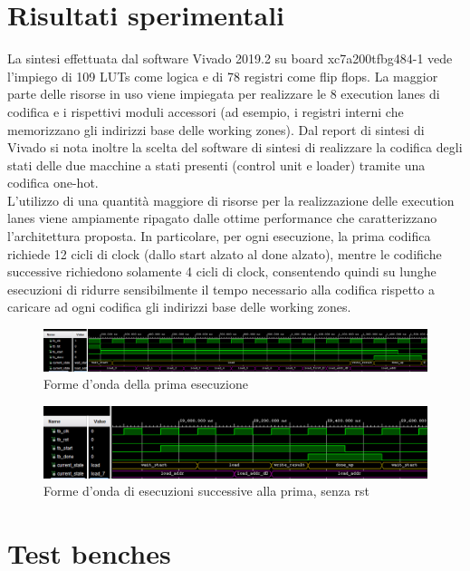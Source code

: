 \documentclass[10pt,english, openany]{book}
\begin{document}
\chapter{Risultati sperimentali}

La sintesi effettuata dal software Vivado 2019.2 su board xc7a200tfbg484-1 vede l’impiego di 109 LUTs come logica e di 78 registri come flip flops. La maggior parte delle risorse in uso viene impiegata per realizzare le 8 execution lanes di codifica e i rispettivi moduli accessori (ad esempio, i registri interni che memorizzano gli indirizzi base delle working zones). Dal report di sintesi di Vivado si nota inoltre la scelta del software di sintesi di realizzare la codifica degli stati delle due macchine a stati presenti (control unit e loader) tramite una codifica one-hot.\\
L’utilizzo di una quantità maggiore di risorse per la realizzazione delle execution lanes viene ampiamente ripagato dalle ottime performance che caratterizzano l’architettura proposta. In particolare, per ogni esecuzione, la prima codifica richiede 12 cicli di clock (dallo start alzato al done alzato), mentre le codifiche successive richiedono solamente 4 cicli di clock, consentendo quindi su lunghe esecuzioni di ridurre sensibilmente il tempo necessario alla codifica rispetto a caricare ad ogni codifica gli indirizzi base delle working zones.\\
\begin{figure}[h!]
    \centering
    \includegraphics[scale=0.38]{waveforms_first_encode.PNG}
    \caption{Forme d'onda della prima esecuzione}
    \label{fig:first_encode}
\end{figure}{}
\begin{figure}[h!]
    \centering
    \includegraphics[scale=0.4]{waveforms_consecutive_encode.PNG}
    \caption{Forme d'onda di esecuzioni successive alla prima, senza rst}
    \label{fig:consecutive_encode}
\end{figure}{}

\chapter{Test benches}
\end{document}
